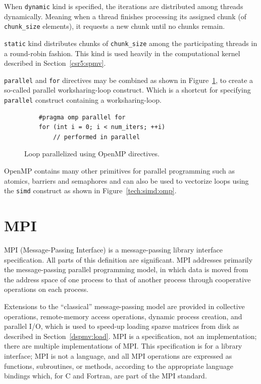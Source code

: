 \documentclass[thesis=M,english]{FITthesis}[2019/12/23]
\begin{document}
When \texttt{dynamic} kind is specified, the iterations are distributed among threads dynamically.
Meaning when a thread finishes processing its assigned chunk (of \texttt{chunk\_size} elements),
it requests a new chunk until no chunks remain.

\texttt{static} kind distributes chunks of \texttt{chunk\_size} among the participating threads in a
round-robin fashion. This kind is used heavily in the computational kernel described in Section~\ref{csr5:spmv}.

\texttt{parallel} and \texttt{for} directives may be combined as shown in Figure~\ref{tech:omp:loop},
to create a so-called parallel worksharing-loop construct. Which is a shortcut for specifying
\texttt{parallel} construct containing a worksharing-loop.

\begin{figure}[htp]
    \begin{verbatim}
    #pragma omp parallel for
    for (int i = 0; i < num_iters; ++i)
        // performed in parallel
    \end{verbatim}
    \caption{Loop parallelized using OpenMP directives.}\label{tech:omp:loop}
\end{figure}


OpenMP contains many other primitives for parallel programming such as atomics, barriers
and semaphores and can also be used to vectorize loops using the \texttt{simd} construct as shown
in Figure~\ref{tech:simd:omp}.

\section{MPI}\label{tech:mpi}

MPI (Message-Passing Interface) is a message-passing library interface specification.
All parts of this definition are significant. MPI addresses primarily the message-passing parallel
programming model, in which data is moved from the address space of one process to
that of another process through cooperative operations on each process.

Extensions to the
“classical” message-passing model are provided in collective operations, remote-memory
access operations, dynamic process creation, and parallel I/O, which is used to speed-up loading
sparse matrices from disk as described in Section~\ref{dspmv:load}. MPI is a specification, not
an implementation; there are multiple implementations of MPI. This specification is for a
library interface; MPI is not a language, and all MPI operations are expressed as functions,
subroutines, or methods, according to the appropriate language bindings which, for C and
Fortran, are part of the MPI standard.
\cite{mpi40}
\end{document}
